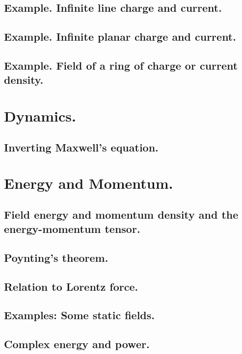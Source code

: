          \subsection{Example.  Infinite line charge and current.}
            
         \subsection{Example.  Infinite planar charge and current.}
            
         \subsection{Example.  Field of a ring of charge or current density.}
            
      \section{Dynamics.}
         \subsection{Inverting Maxwell's equation.}
            
      \section{Energy and Momentum.}
         \subsection{Field energy and momentum density and the energy-momentum tensor.}
            
         \subsection{Poynting's theorem.}
            
         \subsection{Relation to Lorentz force.}
            
         \subsection{Examples: Some static fields.}
            
         \subsection{Complex energy and power.}
            
